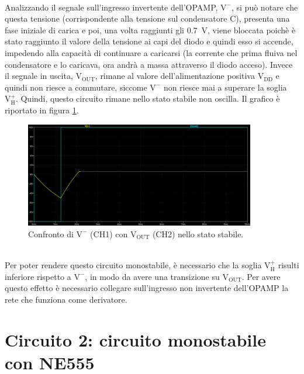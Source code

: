 \documentclass{report}
\begin{document}
\\Analizzando il segnale sull'ingresso invertente dell'OPAMP, $\mathrm{V^-}$, si può notare che questa tensione (corrispondente alla tensione sul condensatore C), presenta una fase iniziale di carica e poi, una volta raggiunti gli \SI{0.7}{\volt}, viene bloccata poichè è stato raggiunto il valore della tensione ai capi del diodo e quindi esso si accende, impedendo alla capacità di continuare a caricarsi (la corrente che prima fluiva nel condensatore e lo caricava, ora andrà a massa attraverso il diodo acceso). Invece il segnale in uscita, $\mathrm{V_{OUT}}$, rimane al valore dell'alimentazione positiva $\mathrm{V_{DD}}$ e quindi non riesce a commutare, siccome $\mathrm{V^-}$ non riesce mai a superare la soglia $\mathrm{V_H^+}$. Quindi, questo circuito rimane nello stato stabile non oscilla. Il grafico è riportato in figura \ref{figura:simulazione1}. 
\begin{figure}[h!]
	\centering
	\includegraphics[height=4.6cm]{immagini/plot_sim_stabile}
	\caption{Confronto di $\mathrm{V^-}$ (CH1) con $\mathrm{V_{OUT}}$ (CH2) nello stato stabile.}
	\label{figura:simulazione1}
\end{figure}
\\Per poter rendere questo circuito monostabile, è necessario che la soglia $\mathrm{V_H^+}$ risulti inferiore rispetto a $\mathrm{V^-}$, in modo da avere una transizione su $\mathrm{V_{OUT}}$. Per avere questo effetto è necessario collegare sull'ingresso non invertente dell'OPAMP la rete che funziona come derivatore.

\newpage
\section{Circuito 2: circuito monostabile con NE555}
\end{document}
